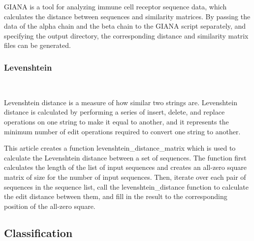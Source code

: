 \documentclass[conference]{IEEEtran}
\begin{document}
	GIANA\cite{b2} is a tool for analyzing immune cell receptor sequence data, which calculates the distance between sequences and similarity matrices. By passing the data of the alpha chain and the beta chain to the GIANA script separately, and specifying the output directory, the corresponding distance and similarity matrix files can be generated.
	
	\subsubsection{Levenshtein} \
	
	Levenshtein distance is a measure of how similar two strings are. Levenshtein distance is calculated by performing a series of insert, delete, and replace operations on one string to make it equal to another, and it represents the minimum number of edit operations required to convert one string to another.
	
	This article creates a function levenshtein\_distance\_matrix which is used to calculate the Levenshtein distance between a set of sequences. The function first calculates the length of the list of input sequences and creates an all-zero square matrix of size for the number of input sequences. Then, iterate over each pair of sequences in the sequence list, call the levenshtein\_distance function to calculate the edit distance between them, and fill in the result to the corresponding position of the all-zero square.
	
	\subsection{Classification}
	
	
	
\end{document}
